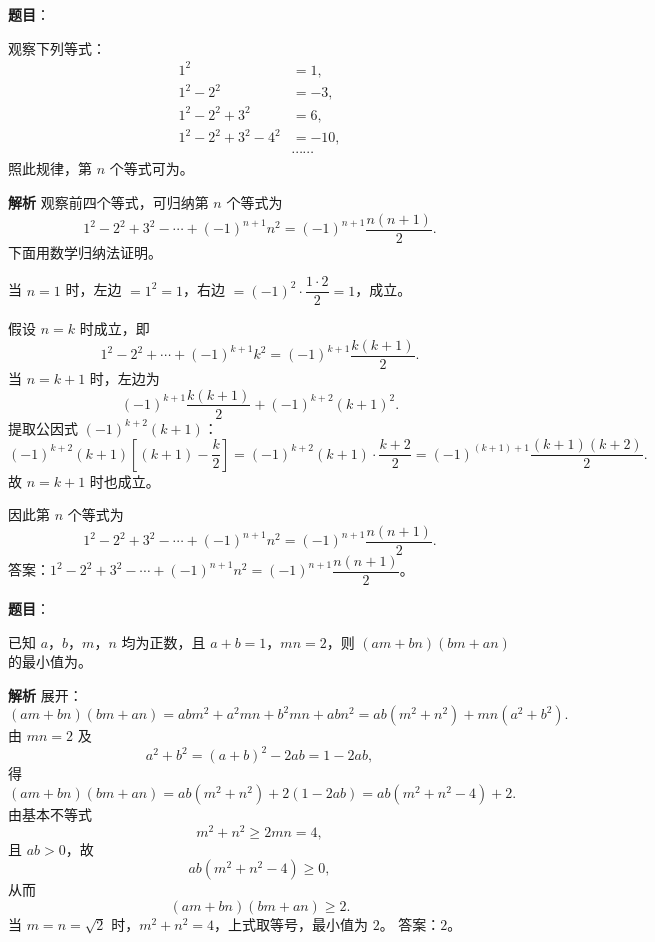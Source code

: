 \begin{answer}

\textbf{题目}：

观察下列等式：
\nopagebreak[4]
\[\begin{aligned}
1^2&=1,\\
1^2-2^2&=-3,\\
1^2-2^2+3^2&=6,\\
1^2-2^2+3^2-4^2&=-10,\\
&\cdots\cdots
\end{aligned}\]
照此规律，第 $n$ 个等式可为\gkblank{}。

\textbf{解析}
观察前四个等式，可归纳第 $n$ 个等式为
\nopagebreak[4]
\[1^2-2^2+3^2-\cdots+(-1)^{n+1}n^2=(-1)^{n+1}\frac{n(n+1)}2.\]
下面用数学归纳法证明。

当 $n=1$ 时，左边 $=1^2=1$，右边 $=(-1)^2\cdot\dfrac{1\cdot2}{2}=1$，成立。

假设 $n=k$ 时成立，即
\nopagebreak[4]
\[1^2-2^2+\cdots+(-1)^{k+1}k^2=(-1)^{k+1}\frac{k(k+1)}2.\]
当 $n=k+1$ 时，左边为
\nopagebreak[4]
\[(-1)^{k+1}\frac{k(k+1)}2+(-1)^{k+2}(k+1)^2.\]
提取公因式 $(-1)^{k+2}(k+1)$：
\nopagebreak[4]
\[(-1)^{k+2}(k+1)\left[(k+1)-\frac k2\right]
=(-1)^{k+2}(k+1)\cdot\frac{k+2}{2}
=(-1)^{(k+1)+1}\frac{(k+1)(k+2)}2.\]
故 $n=k+1$ 时也成立。

因此第 $n$ 个等式为
\nopagebreak[4]
\[1^2-2^2+3^2-\cdots+(-1)^{n+1}n^2=(-1)^{n+1}\frac{n(n+1)}2.\]
答案：$1^2-2^2+3^2-\cdots+(-1)^{n+1}n^2=(-1)^{n+1}\dfrac{n(n+1)}2$。


\end{answer}
\begin{answer}

\textbf{题目}：

已知 $a$，$b$，$m$，$n$ 均为正数，且 $a+b=1$，$mn=2$，则 $(am+bn)(bm+an)$ 的最小值为\gkblank{}。

\textbf{解析}
展开：
\nopagebreak[4]
\[(am+bn)(bm+an)
=abm^2+a^2mn+b^2mn+abn^2
=ab(m^2+n^2)+mn(a^2+b^2).\]
由 $mn=2$ 及
\nopagebreak[4]
\[a^2+b^2=(a+b)^2-2ab=1-2ab,\]
得
\nopagebreak[4]
\[(am+bn)(bm+an)
=ab(m^2+n^2)+2(1-2ab)
=ab(m^2+n^2-4)+2.\]
由基本不等式
\nopagebreak[4]
\[m^2+n^2\geqslant2mn=4,\]
且 $ab>0$，故
\nopagebreak[4]
\[ab(m^2+n^2-4)\geqslant0,\]
从而
\nopagebreak[4]
\[(am+bn)(bm+an)\geqslant2.\]
当 $m=n=\sqrt2$ 时，$m^2+n^2=4$，上式取等号，最小值为 $2$。
答案：$2$。


\end{answer}
